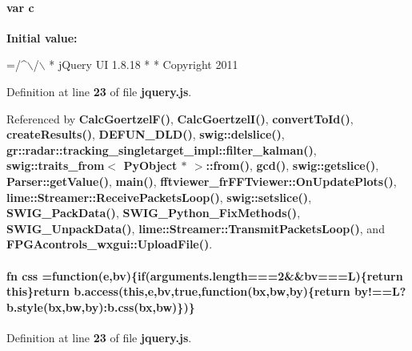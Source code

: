 \paragraph[{c}]{\setlength{\rightskip}{0pt plus 5cm}var c}\label{soapysdr_2build_2docs_2html_2jquery_8js_abce695e0af988ece0826d9ad59b8160d}
{\bfseries Initial value\+:}
\begin{DoxyCode}
=/^\(\backslash\)/\(\backslash\)
 * jQuery UI 1.8.18
 *
 * Copyright 2011
\end{DoxyCode}


Definition at line {\bf 23} of file {\bf jquery.\+js}.



Referenced by {\bf Calc\+Goertzel\+F()}, {\bf Calc\+Goertzel\+I()}, {\bf convert\+To\+Id()}, {\bf create\+Results()}, {\bf D\+E\+F\+U\+N\+\_\+\+D\+L\+D()}, {\bf swig\+::delslice()}, {\bf gr\+::radar\+::tracking\+\_\+singletarget\+\_\+impl\+::filter\+\_\+kalman()}, {\bf swig\+::traits\+\_\+from$<$ Py\+Object $\ast$ $>$\+::from()}, {\bf gcd()}, {\bf swig\+::getslice()}, {\bf Parser\+::get\+Value()}, {\bf main()}, {\bf fftviewer\+\_\+fr\+F\+F\+Tviewer\+::\+On\+Update\+Plots()}, {\bf lime\+::\+Streamer\+::\+Receive\+Packets\+Loop()}, {\bf swig\+::setslice()}, {\bf S\+W\+I\+G\+\_\+\+Pack\+Data()}, {\bf S\+W\+I\+G\+\_\+\+Python\+\_\+\+Fix\+Methods()}, {\bf S\+W\+I\+G\+\_\+\+Unpack\+Data()}, {\bf lime\+::\+Streamer\+::\+Transmit\+Packets\+Loop()}, and {\bf F\+P\+G\+Acontrols\+\_\+wxgui\+::\+Upload\+File()}.

\paragraph[{css}]{ fn css =function(e,bv)\{{\bf if}({\bf arguments.\+length}===2\&\&bv==={\bf L})\{return this\}return {\bf b.\+access}(this,e,bv,true,function(bx,{\bf bw},by)\{return by!=={\bf L}?b.\+style(bx,{\bf bw},by)\+:b.\+css(bx,{\bf bw})\})\}}\label{soapysdr_2build_2docs_2html_2jquery_8js_a89ad527fcd82c01ebb587332f5b4fcd4}


Definition at line {\bf 23} of file {\bf jquery.\+js}.



